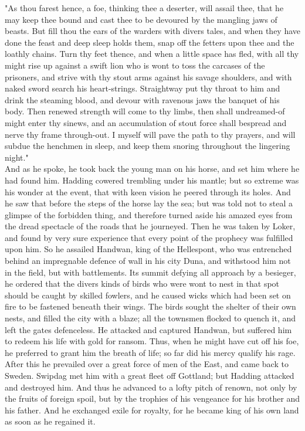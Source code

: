\documentclass[10pt,a4paper]{report}
\begin{document}
"As thou farest hence, a foe, thinking thee a deserter, will assail thee, that he may keep thee bound and cast thee to be devoured by the mangling jaws of beasts. But fill thou the ears of the warders with divers tales, and when they have done the feast and deep sleep holds them, snap off the fetters upon thee and the loathly chains. Turn thy feet thence, and when a little space has fled, with all thy might rise up against a swift lion who is wont to toss the carcases of the prisoners, and strive with thy stout arms against his savage shoulders, and with naked sword search his heart-strings. Straightway put thy throat to him and drink the steaming blood, and devour with ravenous jaws the banquet of his body. Then renewed strength will come to thy limbs, then shall undreamed-of might enter thy sinews, and an accumulation of stout force shall bespread and nerve thy frame through-out. I myself will pave the path to thy prayers, and will subdue the henchmen in sleep, and keep them snoring throughout the lingering night."\\

And as he spoke, he took back the young man on his horse, and set him where he had found him. Hadding cowered trembling under his mantle; but so extreme was his wonder at the event, that with keen vision he peered through its holes. And he saw that before the steps of the horse lay the sea; but was told not to steal a glimpse of the forbidden thing, and therefore turned aside his amazed eyes from the dread spectacle of the roads that he journeyed. Then he was taken by Loker, and found by very sure experience that every point of the prophecy was fulfilled upon him. So he assailed Handwan, king of the Hellespont, who was entrenched behind an impregnable defence of wall in his city Duna, and withstood him not in the field, but with battlements. Its summit defying all approach by a besieger, he ordered that the divers kinds of birds who were wont to nest in that spot should be caught by skilled fowlers, and he caused wicks which had been set on fire to be fastened beneath their wings. The birds sought the shelter of their own nests, and filled the city with a blaze; all the townsmen flocked to quench it, and left the gates defenceless. He attacked and captured Handwan, but suffered him to redeem his life with gold for ransom. Thus, when he might have cut off his foe, he preferred to grant him the breath of life; so far did his mercy qualify his rage.\\

After this he prevailed over a great force of men of the East, and came back to Sweden. Swipdag met him with a great fleet off Gottland; but Hadding attacked and destroyed him. And thus he advanced to a lofty pitch of renown, not only by the fruits of foreign spoil, but by the trophies of his vengeance for his brother and his father. And he exchanged exile for royalty, for he became king of his own land as soon as he regained it.\\
\end{document}
